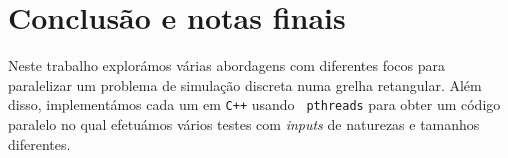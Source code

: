 \documentclass[10pt,a4paper,oneside]{article}
\begin{document}


\section{Conclusão e notas finais}
\label{sec:con}
Neste trabalho explorámos várias abordagens com diferentes focos para
paralelizar um problema de simulação discreta numa grelha
retangular. Além disso, implementámos cada um em {\tt C++} usando {\tt
  pthreads} para obter um código paralelo no qual efetuámos vários
testes com \textit{inputs} de naturezas e tamanhos diferentes.


%
%
\end{document}
